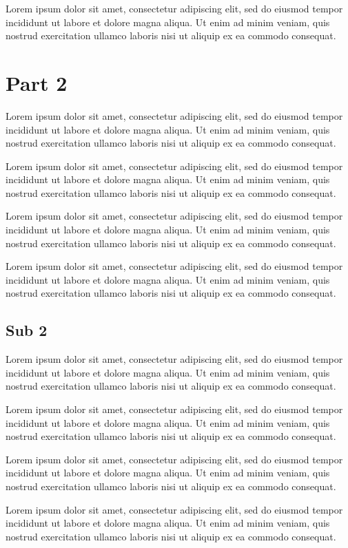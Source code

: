 \documentclass{article}
\begin{document}
Lorem ipsum dolor sit amet, consectetur adipiscing elit, sed do eiusmod tempor incididunt ut labore et dolore magna aliqua. Ut enim ad minim veniam, quis nostrud exercitation ullamco laboris nisi ut aliquip ex ea commodo consequat.

\section{Part 2}
Lorem ipsum dolor sit amet, consectetur adipiscing elit, sed do eiusmod tempor incididunt ut labore et dolore magna aliqua. Ut enim ad minim veniam, quis nostrud exercitation ullamco laboris nisi ut aliquip ex ea commodo consequat.

Lorem ipsum dolor sit amet, consectetur adipiscing elit, sed do eiusmod tempor incididunt ut labore et dolore magna aliqua. Ut enim ad minim veniam, quis nostrud exercitation ullamco laboris nisi ut aliquip ex ea commodo consequat.

Lorem ipsum dolor sit amet, consectetur adipiscing elit, sed do eiusmod tempor incididunt ut labore et dolore magna aliqua. Ut enim ad minim veniam, quis nostrud exercitation ullamco laboris nisi ut aliquip ex ea commodo consequat.

Lorem ipsum dolor sit amet, consectetur adipiscing elit, sed do eiusmod tempor incididunt ut labore et dolore magna aliqua. Ut enim ad minim veniam, quis nostrud exercitation ullamco laboris nisi ut aliquip ex ea commodo consequat.

\subsection{Sub 2}
Lorem ipsum dolor sit amet, consectetur adipiscing elit, sed do eiusmod tempor incididunt ut labore et dolore magna aliqua. Ut enim ad minim veniam, quis nostrud exercitation ullamco laboris nisi ut aliquip ex ea commodo consequat.

Lorem ipsum dolor sit amet, consectetur adipiscing elit, sed do eiusmod tempor incididunt ut labore et dolore magna aliqua. Ut enim ad minim veniam, quis nostrud exercitation ullamco laboris nisi ut aliquip ex ea commodo consequat.

Lorem ipsum dolor sit amet, consectetur adipiscing elit, sed do eiusmod tempor incididunt ut labore et dolore magna aliqua. Ut enim ad minim veniam, quis nostrud exercitation ullamco laboris nisi ut aliquip ex ea commodo consequat.

Lorem ipsum dolor sit amet, consectetur adipiscing elit, sed do eiusmod tempor incididunt ut labore et dolore magna aliqua. Ut enim ad minim veniam, quis nostrud exercitation ullamco laboris nisi ut aliquip ex ea commodo consequat.
\end{document}
